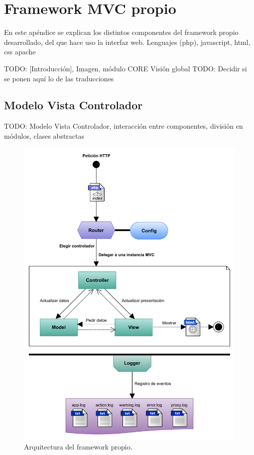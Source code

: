 \chapter{Framework MVC propio\label{extra:framework_mvc_propio}}

En este apéndice se explican los distintos componentes del \gls{framework} propio desarrollado, del que hace uso la interfaz web. 
Lenguajes (php), javascript, html, css
apache

TODO: [Introducción], Imagen, módulo CORE
  {Visión global}
TODO: Decidir si se ponen aquí lo de las traducciones

\section{Modelo Vista Controlador\label{extra:mvc:mvc}}

TODO: Modelo Vista Controlador, interacción entre componentes, división en módulos,
clases abstractas

\begin{figure}[!htp]
  \centering
  \includegraphics[width=\textwidth,clip=true]{graphics/framework}
  \caption{Arquitectura del \gls{framework} propio.}
  \label{fig:framework}
\end{figure}

